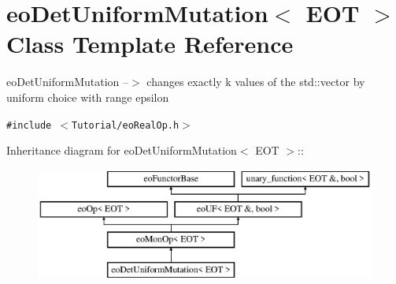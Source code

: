 \section{eo\-Det\-Uniform\-Mutation$<$ EOT $>$ Class Template Reference}
\label{classeo_det_uniform_mutation}
eo\-Det\-Uniform\-Mutation --$>$ changes exactly k values of the std::vector by uniform choice with range epsilon  


{\tt \#include $<$Tutorial/eo\-Real\-Op.h$>$}

Inheritance diagram for eo\-Det\-Uniform\-Mutation$<$ EOT $>$::\begin{figure}[H]
\begin{center}
\leavevmode
\includegraphics[height=3.71476cm]{classeo_det_uniform_mutation}
\end{center}
\end{figure}
